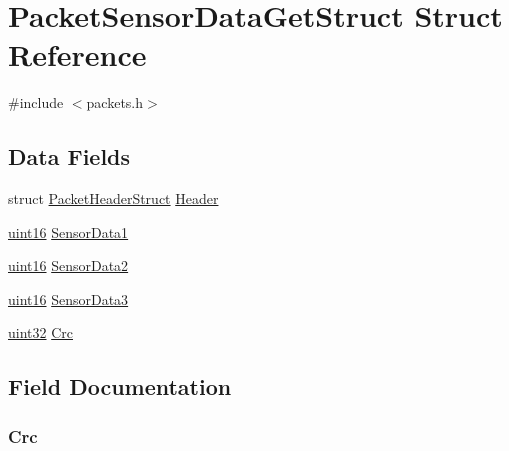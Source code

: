 \hypertarget{struct_packet_sensor_data_get_struct}{}\section{Packet\+Sensor\+Data\+Get\+Struct Struct Reference}
\label{struct_packet_sensor_data_get_struct}


{\ttfamily \#include $<$packets.\+h$>$}

\subsection*{Data Fields}
\begin{DoxyCompactItemize}
\item 
struct \hyperlink{struct_packet_header_struct}{Packet\+Header\+Struct} \hyperlink{struct_packet_sensor_data_get_struct_ab201af50281aff5ed4f984f994938007}{Header}
\item 
\hyperlink{_h_y_d_r_a_s_8_x_2types_8h_ac2a9e79eb120216f855626495b7bd18a}{uint16} \hyperlink{struct_packet_sensor_data_get_struct_a0a8ee9f45b646be8f50ba0823043e9e2}{Sensor\+Data1}
\item 
\hyperlink{_h_y_d_r_a_s_8_x_2types_8h_ac2a9e79eb120216f855626495b7bd18a}{uint16} \hyperlink{struct_packet_sensor_data_get_struct_adeec218d713b92dec76e479bf7d0a30d}{Sensor\+Data2}
\item 
\hyperlink{_h_y_d_r_a_s_8_x_2types_8h_ac2a9e79eb120216f855626495b7bd18a}{uint16} \hyperlink{struct_packet_sensor_data_get_struct_ad3730a11ddccc4b73d16714fa8415551}{Sensor\+Data3}
\item 
\hyperlink{_h_y_d_r_a_s_8_x_2types_8h_acbd4acd0d29e2d6c43104827f77d9cd2}{uint32} \hyperlink{struct_packet_sensor_data_get_struct_a1aaa4998291cff4c19ca5cca4b1e9489}{Crc}
\end{DoxyCompactItemize}


\subsection{Field Documentation}
\hypertarget{struct_packet_sensor_data_get_struct_a1aaa4998291cff4c19ca5cca4b1e9489}{}
\subsubsection[{Crc}]{ Crc}\label{struct_packet_sensor_data_get_struct_a1aaa4998291cff4c19ca5cca4b1e9489}
\hypertarget{struct_packet_sensor_data_get_struct_ab201af50281aff5ed4f984f994938007}{}
